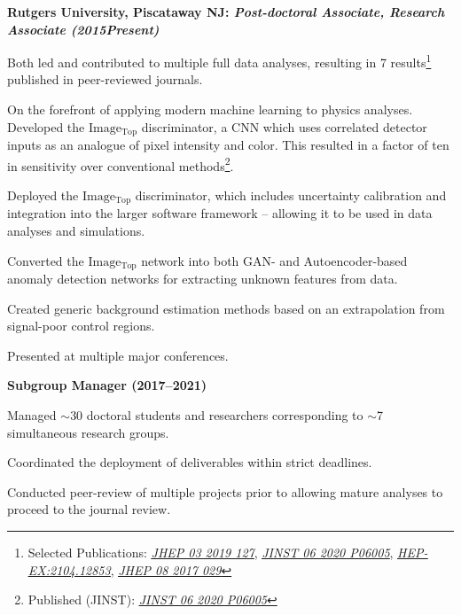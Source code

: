 \documentclass[12pt]{article}
\begin{document}
\textbf{\hspace*{0.2cm}Rutgers University, Piscataway NJ: \textit{Post-doctoral Associate, Research Associate (2015\textendash Present)}}
\begin{newitemize2}
  \item Both led and contributed to multiple full data analyses, resulting in 7 results\footnote{Selected Publications: \href{https://doi.org/10.1088\%2F1748-0221\%2F15\%2F06\%2Fp06005}{\textit{\underline{JHEP 03 2019 127}}}, \href{https://doi.org/10.1088\%2F1748-0221\%2F15\%2F06\%2Fp06005} {\textit{\underline{JINST 06 2020 P06005}}},  \href{https://arxiv.org/abs/2104.12853}{\textit{\underline{HEP-EX:2104.12853}}}, \href{http://dx.doi.org/10.1007/JHEP08(2017)029}{\textit{\underline{JHEP 08 2017 029}}}} published in peer-reviewed journals.
  \item On the forefront of applying modern machine learning to physics analyses.  Developed the $\mathrm{Image_{Top}}$ discriminator, a CNN which uses correlated detector inputs as an analogue of pixel intensity and color.  This resulted in a factor of ten in sensitivity over conventional methods\footnote{Published (JINST): \href{https://doi.org/10.1088\%2F1748-0221\%2F15\%2F06\%2Fp06005} {\textit{\underline{JINST 06 2020 P06005}}}}.
  \item Deployed the $\mathrm{Image_{Top}}$ discriminator, which includes uncertainty calibration and integration into the larger software framework -- allowing it to be used in data analyses and simulations.
  \item Converted the $\mathrm{Image_{Top}}$ network into both GAN- and Autoencoder-based anomaly detection networks for extracting unknown features from data.
  \item Created generic background estimation methods based on an extrapolation from signal-poor control regions.
  \item Presented at multiple major conferences.\\
\end{newitemize2}
\textbf{\hspace*{0.2cm}Subgroup Manager (2017–2021)}
\begin{newitemize2}
\item Managed $\sim$30 doctoral students and researchers corresponding to $\sim$7 simultaneous research groups.
\item Coordinated the deployment of deliverables within strict deadlines.
\item Conducted peer-review of multiple projects prior to allowing mature analyses to proceed to the journal review.
\end{newitemize2}
\end{document}
